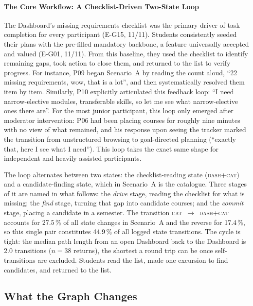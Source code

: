 \paragraph{The Core Workflow: A Checklist-Driven Two-State Loop}
\label{sec:eval-loop}

The Dashboard's missing-requirements checklist was the primary driver of task completion for every participant (E-G15, 11/11). Students consistently seeded their plans with the pre-filled mandatory backbone, a feature universally accepted and valued (E-G01, 11/11). From this baseline, they used the checklist to identify remaining gaps, took action to close them, and returned to the list to verify progress. For instance, P09 began Scenario~A by reading the count aloud, \enquote{22 missing requirements, wow, that is a lot}, and then systematically resolved them item by item. Similarly, P10 explicitly articulated this feedback loop: \enquote{I need narrow-elective modules, transferable skills, so let me see what narrow-elective ones there are}. For the most junior participant, this loop only emerged after moderator intervention: P06 had been placing courses for roughly nine minutes with no view of what remained, and his response upon seeing the tracker marked the transition from unstructured browsing to goal-directed planning (\enquote{exactly that, here I see what I need}). This loop takes the exact same shape for independent and heavily assisted participants.

The loop alternates between two states: the checklist-reading state (\textsc{dash+cat})
and a candidate-finding state, which in Scenario~A is the catalogue. Three stages of it are
named in what follows: the \emph{drive} stage, reading the checklist for what is missing;
the \emph{find} stage, turning that gap into candidate courses; and the \emph{commit}
stage, placing a candidate in a semester. The transition
\textsc{cat}~$\rightarrow$~\textsc{dash+cat} accounts for 27.5\,\% of all state changes in
Scenario~A and the reverse for 17.4\,\%, so this single pair constitutes 44.9\,\% of all
logged state transitions. The cycle is tight: the median path length from an open
Dashboard back to the Dashboard is 2.0 transitions ($n=38$ returns), the shortest a round
trip can be once self-transitions are excluded. Students read the list, made one excursion
to find candidates, and returned to the list.

\subsection{What the Graph Changes}
\label{sec:eval-ab}


